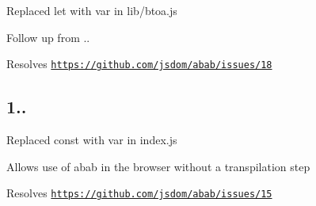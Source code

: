 
\begin{DoxyItemize}
\item Replaced {\ttfamily let} with {\ttfamily var} in {\ttfamily lib/btoa.\+js}
\begin{DoxyItemize}
\item Follow up from {..}
\item Resolves \href{https://github.com/jsdom/abab/issues/18}{\tt https\+://github.\+com/jsdom/abab/issues/18}
\end{DoxyItemize}
\end{DoxyItemize}

\subsection*{1..}


\begin{DoxyItemize}
\item Replaced {\ttfamily const} with {\ttfamily var} in {\ttfamily index.\+js}
\begin{DoxyItemize}
\item Allows use of {\ttfamily abab} in the browser without a transpilation step
\item Resolves \href{https://github.com/jsdom/abab/issues/15}{\tt https\+://github.\+com/jsdom/abab/issues/15} 
\end{DoxyItemize}
\end{DoxyItemize}
